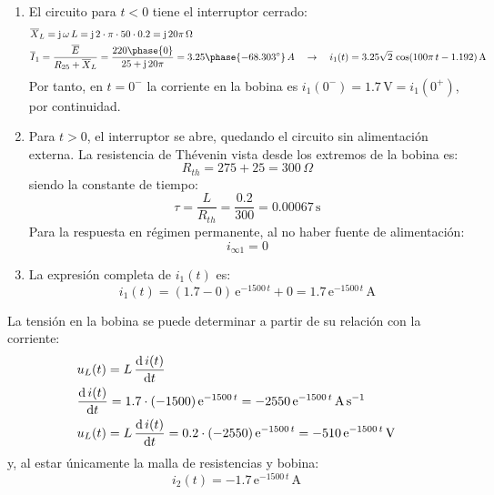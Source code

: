\begin{enumerate}
    \item El circuito para $t<0$ tiene el interruptor cerrado:
    \begin{align*}
        &\overline{X}_L=\mathrm{j}\,\omega\,L=\mathrm{j}\,2\cdot\pi\cdot 50\cdot 0.2=\mathrm{j}\,20\pi\,\Omega\\
        &\overline{I}_1=\dfrac{\overline{E}}{R_{25}+\overline{X}_L}=\dfrac{220\phase{0}}{25+\mathrm{j}\,20\pi}=3.25\phase{-68.303^\circ}\,A \quad\rightarrow\quad i_1(t)=3.25\sqrt{2}\,\cos(100\pi\,t-1.192)\,\si{\ampere}
    \end{align*}
    Por tanto, en $t=0^-$ la corriente en la bobina es $i_1(0^-)=1.7\,\si{\volt}=i_1(0^+)$, por continuidad.
    \item Para $t>0$, el interruptor se abre, quedando el circuito sin alimentación externa. La resistencia de Thévenin vista desde los extremos de la bobina es:
    \begin{equation*}
        R_{th}=275+25=300\,\Omega
    \end{equation*}
    siendo la constante de tiempo:
    \begin{equation*}
        \tau=\dfrac{L}{R_{th}}=\dfrac{0.2}{300}=0.00067\,\si{\second}
    \end{equation*}
    Para la respuesta en régimen permanente, al no haber fuente de alimentación:
    \begin{equation*}
        i_{\infty1}=0
    \end{equation*}
    \item La expresión completa de $i_1(t)$ es:
    \begin{equation*}
        i_1(t)=\left(1.7-0 \right)\,\mathrm{e}^{-1500\,t}+0=1.7\,\mathrm{e}^{-1500\,t}\,\si{\ampere}
    \end{equation*}
\end{enumerate}
La tensión en la bobina se puede determinar a partir de su relación con la corriente:
\begin{align*}
    &u_L(t)=L\,\diff{\,i(t)}{t}\\
    &\diff{\,i(t)}{t}=1.7\cdot (-1500)\,\mathrm{e}^{-1500\,t}=-2550\,\mathrm{e}^{-1500\,t}\,\si{\ampere\per\second}\\
    & u_L(t)=L\,\diff{\,i(t)}{t}=0.2\cdot (-2550)\,\mathrm{e}^{-1500\,t}=-510\,\mathrm{e}^{-1500\,t}\,\si{\volt}
\end{align*}
y, al estar únicamente la malla de resistencias y bobina:
\begin{equation*}
    i_2(t)=-1.7\,\mathrm{e}^{-1500\,t}\,\si{\ampere}
\end{equation*}


